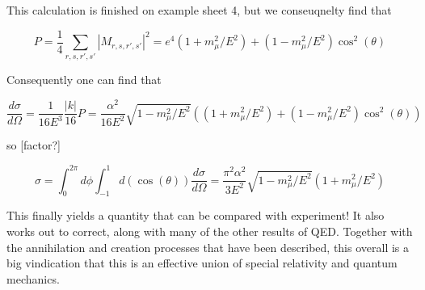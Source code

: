 \documentclass{article}
\theoremstyle{definition}
\begin{document}
This calculation is finished on example sheet 4, but we conseuqnelty find that

$$P = \frac{1}{4} \sum_{r, s, r', s'} |M_{r,s,r',s'}|^2 = e^4(1 + m_\mu^2 / E^2)
+ (1 - m_\mu^2 / E^2) \cos^2(\theta) $$

Consequently one can find that

$$ \frac{d\sigma}{d \Omega} = \frac{1}{16 E^3} \frac{|k|}{16} P =
\frac{\alpha^2}{16E^2} \sqrt{1 - m_\mu^2 / E^2} \left( (1 + m_\mu^2 / E^2) + (1
  - m_\mu^2 / E^2) \cos^2(\theta) \right) $$

so [factor?]

$$ \sigma = \int^{2\pi}_0 d\phi \int^1_{-1} d(\cos(\theta)) \frac{d\sigma}{d
  \Omega} = \frac{\pi^2 \alpha^2}{3 E^2} \sqrt{1 - m_\mu^2 / E^2} (1 + m_\mu^2 /
E^2) $$

This finally yields a quantity that can be compared with experiment! It also
works out to correct, along with many of the other results of QED. Together with
the annihilation and creation processes that have been described, this overall
is a big vindication that this is an effective union of special relativity and
quantum mechanics.
\end{document}
